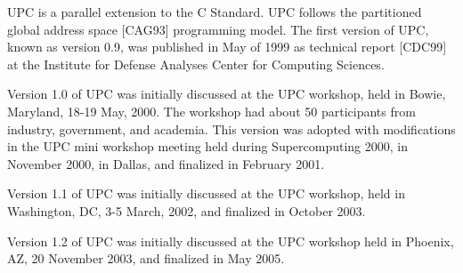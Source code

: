 
\npf UPC is a parallel extension to the C Standard.  UPC follows the
    partitioned global address space [CAG93] programming model.
    The first version
    of UPC, known as version 0.9, was published in May of 1999 as
    technical report [CDC99] at the Institute for Defense Analyses
    Center for Computing Sciences.

\np Version 1.0 of UPC was initially discussed at the
    UPC workshop, held in Bowie, Maryland, 18-19 May, 2000.  The
    workshop had about 50 participants from industry, government, and
    academia. This version was adopted with modifications in the UPC
    mini workshop meeting held during Supercomputing 2000, in November
    2000, in Dallas, and finalized in February 2001.

\np Version 1.1 of UPC was initially discussed at the UPC
    workshop, held in Washington, DC, 3-5 March, 2002, and finalized
    in October 2003.
    
\np Version 1.2 of UPC was initially discussed at the UPC
   workshop held in Phoenix, AZ, 20 November 2003, and finalized
   in May 2005.
